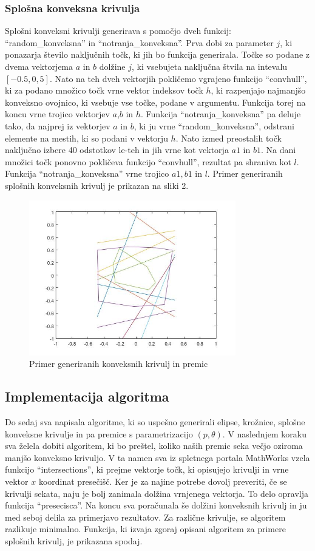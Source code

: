 \documentclass[a4paper]{article}
\begin{document}
\subsubsection{Splošna konveksna krivulja}
Splošni konveksni krivulji generirava s pomočjo dveh funkcij: ``random\_konveksna'' in ``notranja\_konveksna''. Prva dobi za parameter $j$, ki ponazarja število naključnih točk, ki jih bo funkcija generirala. Točke so podane z dvema vektorjema $a$ in $b$ dolžine $j$, ki vsebujeta naključna štvila na intevalu $[-0.5,0,5]$. Nato na teh dveh vektorjih pokličemo vgrajeno funkcijo ``convhull'', ki za podano množico točk vrne vektor indeksov točk $h$, ki razpenjajo  najmanjšo konveksno ovojnico, ki vsebuje vse točke, podane v argumentu. Funkcija torej na koncu vrne trojico vektorjev $a$,$b$ in $h$. Funkcija ``notranja\_konveksna'' pa deluje tako, da najprej iz vektorjev $a$ in $b$, ki ju vrne ``random\_konveksna'', odstrani elemente na mestih, ki so podani v vektorju $h$. Nato izmed preostalih točk naključno izbere 40 odstotkov le-teh in jih vrne kot vektorja $a1$ in $b1$. Na dani množici točk ponovno pokličeva funkcijo ``convhull'', rezultat pa shraniva kot $l$. Funkcija  ``notranja\_konveksna'' vrne trojico $a1,b1$ in $l$. Primer generiranih splošnih konveksnih krivulj je prikazan na sliki 2.

\begin{figure}[h]
\centering
\includegraphics[width=90mm]{primer_konveksne.jpg}
\caption{Primer generiranih konveksnih krivulj in premic \label{overflow}}
\end{figure} 

\subsection{Implementacija algoritma}
Do sedaj sva napisala algoritme, ki so uspešno generirali elipse, krožnice, splošne konveksne krivulje in pa premice s parametrizacijo $(p, \theta)$. V naslednjem koraku sva želela dobiti algoritem, ki bo preštel, koliko naših premic seka večjo oziroma manjšo konveksno krivuljo. V ta namen sva iz spletnega portala MathWorks vzela funkcijo ``intersections'', ki prejme vektorje točk, ki opisujejo krivulji in vrne vektor $x$ koordinat presečišč. Ker je za najine potrebe dovolj preveriti, če se krivulji sekata, naju je bolj zanimala dolžina vrnjenega vektorja. To delo opravlja funkcija ``presecisca''. Na koncu sva poračunala še dolžini konveksnih krivulj in ju med seboj delila za primerjavo rezultatov. Za različne krivulje, se algoritem razlikuje minimalno. Funkcija, ki izvaja zgoraj opisani algoritem za primere splošnih krivulj, je prikazana spodaj.
\end{document}
